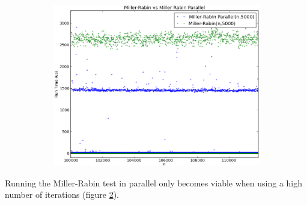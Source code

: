 \documentclass[compressed,final,notitlepage,narroweqnarray,inline,twoside,]{ieee}
\begin{document}
\begin{figure}
        \centering
        \begin{subfigure}[b]{0.525\textwidth}
                \includegraphics[width=\textwidth]{../images/MR_MRP_large_runtime}
                \label{fig:gull}
        \end{subfigure}
        \vspace{-30pt}\caption{}\label{fig:mr_p_comparison_large}
\end{figure}
Running the Miller-Rabin test in parallel only becomes viable when using a high number of iterations (figure \ref{fig:mr_p_comparison_large}).
\end{document}
